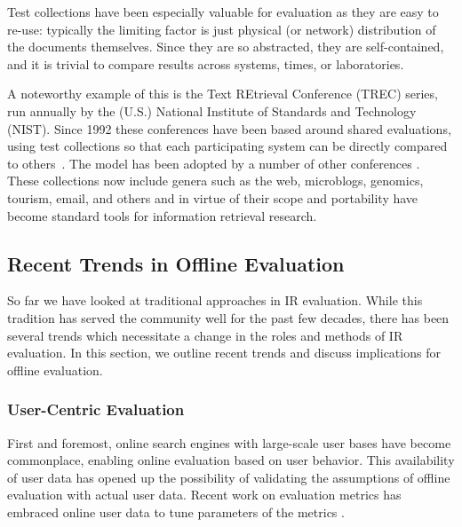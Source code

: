 %


Test collections have been especially valuable for evaluation as they are easy to re-use: typically the limiting factor is just physical (or network) distribution of the documents themselves. Since they are so abstracted, they are self-contained, and it is trivial to compare results across systems, times, or laboratories.

A noteworthy example of this is the Text REtrieval Conference (TREC) series, run annually by the (U.S.) National Institute of Standards and Technology (NIST). Since 1992 these conferences have been based around shared evaluations, using test collections so that each participating system can be directly compared to others~\cite{voor:trec05}. The model has been adopted by a number of other conferences . These collections now include genera such as the web, microblogs, genomics, tourism, email, and others and in virtue of their scope and portability have become standard tools for information retrieval research.

\subsection{Recent Trends in Offline Evaluation}

So far we have looked at traditional approaches in IR evaluation. While this tradition has served the community well for the past few decades, there has been several trends which necessitate a change in the roles and methods of IR evaluation. In this section, we outline recent trends and discuss implications for offline evaluation.

\subsubsection{User-Centric Evaluation}
First and foremost, online search engines with large-scale user bases have become commonplace, enabling online evaluation based on user behavior. This availability of user data has opened up the possibility of validating the assumptions of offline evaluation with actual user data. Recent work on evaluation metrics has embraced online user data to tune parameters of the metrics \citep{CarteretteKY11, Carterette:2012}.

